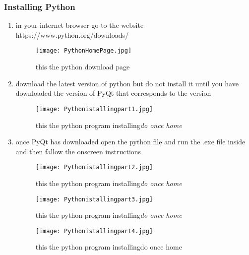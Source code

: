 \subsubsection{Installing Python}
\begin{enumerate}
\item in your internet browser go to the website\newline
https://www.python.org/downloads/
\begin{figure}
\texttt{[image: PythonHomePage.jpg]}
\caption{this the python download page\label{Pyth1}}
\end{figure}
\item download the latest version of python but do not install it until you have downloaded the version of PyQt that corresponds to the version 
\begin{figure}
\texttt{[image: Pythonistallingpart1.jpg]}
\caption{this the python program installing\emph{do once home}\label{Pyth.istprt1}}
\end{figure}
\item once PyQt has downloaded open the python file and run the .exe file inside and then fallow the onscreen instructions
\begin{figure}
\texttt{[image: Pythonistallingpart2.jpg]}
\caption{this the python program installing\emph{do once home}\label{Pyth.istprt2}}
\end{figure}
\begin{figure}
\texttt{[image: Pythonistallingpart3.jpg]}
\caption{this the python program installing\emph{do once home}\label{Pyth.istprt3}}
\end{figure}
\begin{figure}
\texttt{[image: Pythonistallingpart4.jpg]}
\caption{this the python program installing{do once home}\label{Pyth.istprt4}}
\end{figure}
\end{enumerate}
